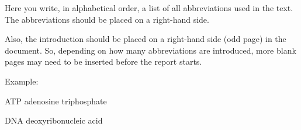 \documentclass[../main.tex]{subfiles}
\begin{document}
Here you write, in alphabetical order, a list of all abbreviations used in the text. The abbreviations should be placed on a right-hand side.

Also, the introduction should be placed on a right-hand side (odd page) in the document. So, depending on how many abbreviations are introduced, more blank pages may need to be inserted before the report starts.

Example:

ATP \quad \quad \quad adenosine triphosphate

DNA	\quad \quad \quad deoxyribonucleic acid
\end{document}
